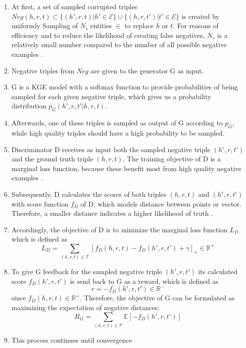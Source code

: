 \begin{enumerate}
    \item 
    At first, a set of sampled corrupted triples $Neg(h,r,t)\subset\{(h',r,t)|h'\in\mathcal{E}\}\cup\{(h,r,t')|t'\in\mathcal{E}\}$ is created by uniformly Sampling of $N_s$ entities $\in$ \entities to replace $h$ or $t$.
    For reasons of efficiency and to reduce the likelihood of creating false negatives, $N_s$ is a relatively small number compared to the number of all possible negative examples \cite{cai2017kbgan}.
    
    \item 
    Negative triples from $Neg$ are given to the generator G as input.
    
    \item 
    G is a \ac{KGE} model with a softmax function to provide  probabilities of being sampled for each given negative triple, which gives us a probability distribution $p_G(h',r,t'|h,r,t)$.

    \item 
    Afterwards, one of these triples is sampled as output of G according to $p_G$, while high quality triples should have a high probability to be sampled.
    
    \item 
    Discriminator D receives as input both the sampled negative triple $(h',r,t')$ and the ground truth triple $(h,r,t)$.
    The training objective of D is a marginal loss function, because these benefit most from high quality negative examples \cite{cai2017kbgan}.

    \item 
    Subsequently, D calculates the scores of both triples $(h,r,t)$ and $(h',r,t')$ with score function $f_D$ of D, which models distance between points or vector.
    Therefore, a smaller distance indicates a higher likelihood of truth \cite{cai2017kbgan}.
    
    \item 
    Accordingly, the objective of D is to minimize the marginal loss function $L_D$ which is defined as
    \begin{equation}
        L_D=\sum_{(h,r,t)\in\mathcal{T}}[f_D(h,r,t)-f_D(h',r,t')+\gamma]_+ \in \mathbb{R}^+
    \end{equation}
    
    \item 
    To give G feedback for the sampled negative triple $(h',r,t')$ its calculated score $f_D(h',r,t')$ is send back to G as a reward, which is defined as
    \begin{equation}
        r = -f_D(h',r,t') \in \mathbb{R}^-
    \end{equation}
    since $f_D(h,r,t) \in \mathbb{R}^+$.
    Therefore, the objective of G can be formulated as maximizing the expectation of negative distances:
    \begin{equation}
        R_G=\sum_{(h,r,t)\in\mathcal{T}}\mathbb{E}[-f_D(h',r,t')]
    \end{equation}
    
    \item
    This process continues until convergence
\end{enumerate}
